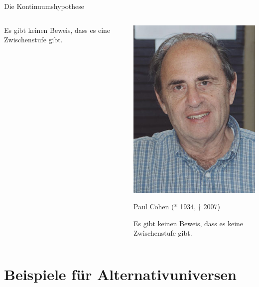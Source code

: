\documentclass[12pt,compress,ngerman,utf8,t]{beamer}
\begin{document}
\begin{frame}{Die Kontinuumshypothese}
\begin{columns}[t]
\begin{column}{0.34\textwidth}
      Es gibt keinen Beweis, dass es eine Zwischenstufe gibt.
    \end{column}
    \pause

    \begin{column}{0.34\textwidth}
      \centering\includegraphics[height=0.5\textheight]{paul-cohen} \\
      {\scriptsize Paul Cohen (* 1934, † 2007)\par}
      \bigskip

      Es gibt keinen Beweis, dass es keine Zwischenstufe gibt.
    \end{column}
  \end{columns}
\end{frame}


\section[Beispiele]{Beispiele für Alternativuniversen}

\end{document}
